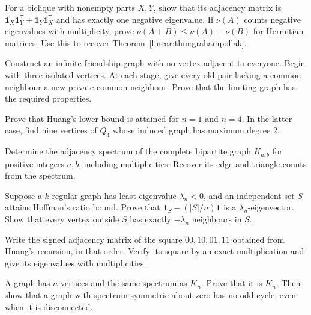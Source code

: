\begin{exercise}[$\star\star\star$]\label{linear:ex:inertia}
For a biclique with nonempty parts $X,Y$, show that its adjacency matrix is $\mathbf1_X\mathbf1_Y^{\mathsf T}+\mathbf1_Y\mathbf1_X^{\mathsf T}$ and has exactly one negative eigenvalue. If $\nu(A)$ counts negative eigenvalues with multiplicity, prove $\nu(A+B)\le\nu(A)+\nu(B)$ for Hermitian matrices. Use this to recover Theorem~\ref{linear:thm:grahampollak}.
\end{exercise}
\begin{exercise}[$\star\star$]\label{linear:ex:infinitefriends}
Construct an infinite friendship graph with no vertex adjacent to everyone. Begin with three isolated vertices. At each stage, give every old pair lacking a common neighbour a new private common neighbour. Prove that the limiting graph has the required properties.
\end{exercise}
\begin{exercise}[$\star\star$]\label{linear:ex:huangsharp}
Prove that Huang's lower bound is attained for $n=1$ and $n=4$. In the latter case, find nine vertices of $Q_4$ whose induced graph has maximum degree $2$.
\end{exercise}

\begin{exercise}[$\star$]\label{ex:v8c05a}
Determine the adjacency spectrum of the complete bipartite graph $K_{a,b}$ for positive integers $a,b$, including multiplicities. Recover its edge and triangle counts from the spectrum.
\end{exercise}
\begin{exercise}[$\star\star$]\label{ex:v8c05b}
Suppose a $k$-regular graph has least eigenvalue $\lambda_n<0$, and an independent set $S$ attains Hoffman's ratio bound. Prove that $\mathbf1_S-(|S|/n)\mathbf1$ is a $\lambda_n$-eigenvector. Show that every vertex outside $S$ has exactly $-\lambda_n$ neighbours in $S$.
\end{exercise}
\begin{exercise}[$\star$]\label{ex:v8c05c}
Write the signed adjacency matrix of the square $00,10,01,11$ obtained from Huang's recursion, in that order. Verify its square by an exact multiplication and give its eigenvalues with multiplicities.
\end{exercise}
\begin{exercise}[$\star\star$]\label{ex:v8c05d}
A graph has $n$ vertices and the same spectrum as $K_n$. Prove that it is $K_n$. Then show that a graph with spectrum symmetric about zero has no odd cycle, even when it is disconnected.
\end{exercise}

